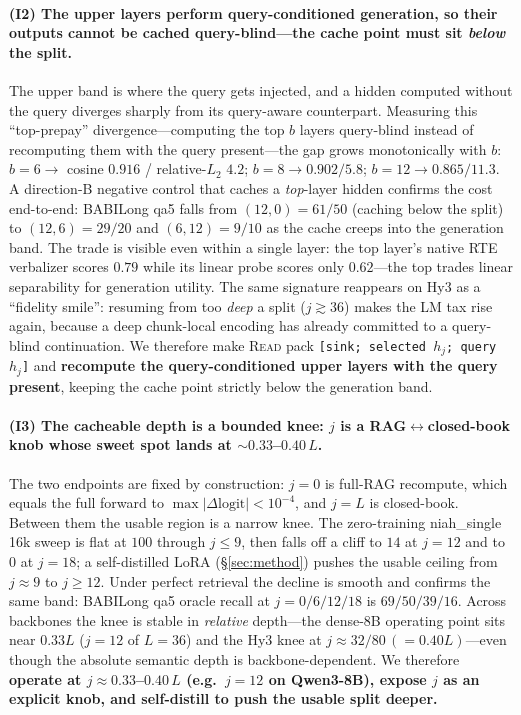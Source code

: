 \paragraph{(I2) The upper layers perform query-conditioned generation, so their
outputs cannot be cached query-blind---the cache point must sit \emph{below} the
split.} The upper band is where the query gets injected, and a hidden computed
without the query diverges sharply from its query-aware counterpart. Measuring
this ``top-prepay'' divergence---computing the top $b$ layers query-blind
instead of recomputing them with the query present---the gap grows monotonically
with $b$: $b{=}6\to$ cosine $0.916$ / relative-$L_2$ $4.2$;
$b{=}8\to 0.902 / 5.8$; $b{=}12\to 0.865 / 11.3$. A direction-B negative
control that caches a \emph{top}-layer hidden confirms the cost end-to-end:
BABILong \citep{babilong} qa5 falls from $(12,0){=}61/50$ (caching below the
split) to $(12,6){=}29/20$ and $(6,12){=}9/10$ as the cache creeps into the
generation band. The trade is visible even within a single layer: the top
layer's native RTE verbalizer scores $0.79$ while its linear probe scores only
$0.62$---the top trades linear separability for generation utility. The same
signature reappears on Hy3 as a ``fidelity smile'': resuming from too \emph{deep}
a split ($j\gtrsim 36$) makes the LM tax rise again, because a deep chunk-local
encoding has already committed to a query-blind continuation. We therefore make
\textsc{Read} pack \texttt{[sink; selected $h_j$; query $h_j$]} and
\textbf{recompute the query-conditioned upper layers with the query present},
keeping the cache point strictly below the generation band.

\paragraph{(I3) The cacheable depth is a bounded knee: $j$ is a
RAG$\leftrightarrow$closed-book knob whose sweet spot lands at
$\sim$$0.33$--$0.40\,L$.} The two endpoints are fixed by construction: $j{=}0$
is full-RAG recompute, which equals the full forward to
$\max|\Delta\text{logit}|<10^{-4}$, and $j{=}L$ is closed-book. Between them the
usable region is a narrow knee. The zero-training niah\_single 16k sweep is flat
at $100$ through $j\le 9$, then falls off a cliff to $14$ at $j{=}12$ and to $0$
at $j{=}18$; a self-distilled LoRA (\S\ref{sec:method}) pushes the usable
ceiling from $j\approx9$ to $j\ge12$. Under perfect retrieval the decline is
smooth and confirms the same band: BABILong qa5 oracle recall at
$j{=}0/6/12/18$ is $69/50/39/16$. Across backbones the knee is stable in
\emph{relative} depth---the dense-8B operating point sits near $0.33L$
($j{=}12$ of $L{=}36$) and the
Hy3 knee at $j\approx32/80\,({=}0.40L)$---even though the absolute
semantic depth is backbone-dependent. We therefore \textbf{operate at
$j\approx0.33$--$0.40\,L$ (e.g.\ $j{=}12$ on Qwen3-8B), expose $j$ as an
explicit knob, and self-distill to push the usable split deeper.}

